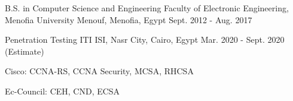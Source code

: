 

\begin{cventries}

  \cventry
    {B.S. in Computer Science and Engineering} %
    {Faculty of Electronic Engineering, Menofia University} %
    {Menouf, Menofia, Egypt} %
    {Sept. 2012 - Aug. 2017} %
    {
      \begin{cvitems} %
      \end{cvitems}
    }
  \cventry
    {Penetration Testing} %
    {ITI} %
    {ISI, Nasr City, Cairo, Egypt} %
    {Mar. 2020 - Sept. 2020 (Estimate)} %
    {
      \begin{cvitems} %
        \item {Cisco: CCNA-RS, CCNA Security, MCSA, RHCSA}
        \item {Ec-Council: CEH, CND, ECSA}
      \end{cvitems}
    }
\end{cventries}
